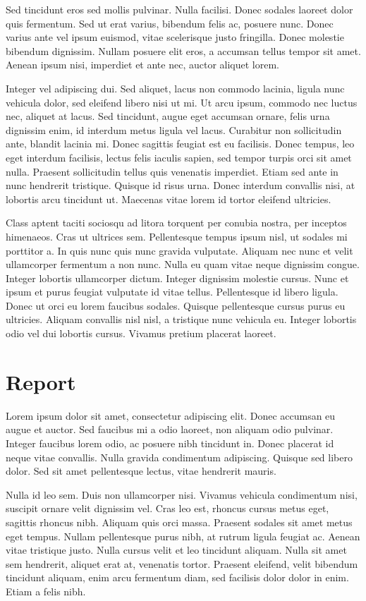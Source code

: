 \documentclass{elec6049report}     %
\begin{document}
Sed tincidunt eros sed mollis pulvinar. Nulla facilisi. Donec sodales laoreet dolor quis fermentum. Sed ut erat varius, bibendum felis ac, posuere nunc. Donec varius ante vel ipsum euismod, vitae scelerisque justo fringilla. Donec molestie bibendum dignissim. Nullam posuere elit eros, a accumsan tellus tempor sit amet. Aenean ipsum nisi, imperdiet et ante nec, auctor aliquet lorem.

Integer vel adipiscing dui. Sed aliquet, lacus non commodo lacinia, ligula nunc vehicula dolor, sed eleifend libero nisi ut mi. Ut arcu ipsum, commodo nec luctus nec, aliquet at lacus. Sed tincidunt, augue eget accumsan ornare, felis urna dignissim enim, id interdum metus ligula vel lacus. Curabitur non sollicitudin ante, blandit lacinia mi. Donec sagittis feugiat est eu facilisis. Donec tempus, leo eget interdum facilisis, lectus felis iaculis sapien, sed tempor turpis orci sit amet nulla. Praesent sollicitudin tellus quis venenatis imperdiet. Etiam sed ante in nunc hendrerit tristique. Quisque id risus urna. Donec interdum convallis nisi, at lobortis arcu tincidunt ut. Maecenas vitae lorem id tortor eleifend ultricies.

Class aptent taciti sociosqu ad litora torquent per conubia nostra, per inceptos himenaeos. Cras ut ultrices sem. Pellentesque tempus ipsum nisl, ut sodales mi porttitor a. In quis nunc quis nunc gravida vulputate. Aliquam nec nunc et velit ullamcorper fermentum a non nunc. Nulla eu quam vitae neque dignissim congue. Integer lobortis ullamcorper dictum. Integer dignissim molestie cursus. Nunc et ipsum et purus feugiat vulputate id vitae tellus. Pellentesque id libero ligula. Donec ut orci eu lorem faucibus sodales. Quisque pellentesque cursus purus eu ultricies. Aliquam convallis nisl nisl, a tristique nunc vehicula eu. Integer lobortis odio vel dui lobortis cursus. Vivamus pretium placerat laoreet.

\section{Report}

Lorem ipsum dolor sit amet, consectetur adipiscing elit. Donec accumsan eu augue et auctor. Sed faucibus mi a odio laoreet, non aliquam odio pulvinar. Integer faucibus lorem odio, ac posuere nibh tincidunt in. Donec placerat id neque vitae convallis. Nulla gravida condimentum adipiscing. Quisque sed libero dolor. Sed sit amet pellentesque lectus, vitae hendrerit mauris.

Nulla id leo sem. Duis non ullamcorper nisi. Vivamus vehicula condimentum nisi, suscipit ornare velit dignissim vel. Cras leo est, rhoncus cursus metus eget, sagittis rhoncus nibh. Aliquam quis orci massa. Praesent sodales sit amet metus eget tempus. Nullam pellentesque purus nibh, at rutrum ligula feugiat ac. Aenean vitae tristique justo. Nulla cursus velit et leo tincidunt aliquam. Nulla sit amet sem hendrerit, aliquet erat at, venenatis tortor. Praesent eleifend, velit bibendum tincidunt aliquam, enim arcu fermentum diam, sed facilisis dolor dolor in enim. Etiam a felis nibh.
\end{document}

